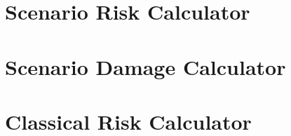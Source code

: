 \section{Scenario Risk Calculator}
   \label{sec:acc-sr}
   
\section{Scenario Damage Calculator}
   \label{sec:acc-sd}
   
\section{Classical Risk Calculator}
   \label{sec:acc-cr}
   
%    
%    

